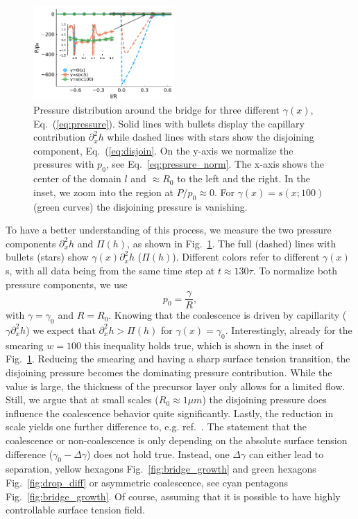 \documentclass[twocolumn,amsmath,amssymb,showpacs,pre,nofootinbib,superscriptaddress]{revtex4-1} %
\begin{document}
\begin{figure}
    \centering
    \includegraphics[width=0.48\textwidth]{Figures/pressures_three_gam_end.pdf}
    \caption{Pressure distribution around the bridge for three different $\gamma(x)$, Eq.~(\ref{eq:pressure}).
    Solid lines with bullets display the capillary contribution $\partial_x^2 h$ while dashed lines with stars show the disjoining component, Eq.~(\ref{eq:disjoin}.
    On the y-axis we normalize the pressures with $p_0$, see Eq.~\ref{eq:pressure_norm}.
    The x-axis shows the center of the domain $l$ and $\approx R_0$ to the left and the right.
    In the inset, we zoom into the region at $P/p_0 \approx 0$. 
    For $\gamma(x) = s(x;100)$ (green curves) the disjoining pressure is vanishing.}
    \label{fig:pressures}
\end{figure}
To have a better understanding of this process, we measure the two pressure components $\partial_x^2 h$ and $\Pi(h)$, as shown in Fig.~\ref{fig:pressures}.
The full (dashed) lines with bullets (stars) show $\gamma(x)\partial_x^2 h$ ($\Pi(h)$). 
Different colors refer to different $\gamma(x)$s, with all data being from the same time step at $t\approx 130\tau$.
To normalize both pressure components, we use 
\begin{equation}\label{eq:pressure_norm}
    p_0 = \frac{\gamma}{R},
\end{equation}
with $\gamma = \gamma_0$ and $R = R_0$.
Knowing that the coalescence is driven by capillarity ($\gamma\partial_x^2 h$) we expect that $\partial_x^2 h > \Pi(h)$ for $\gamma(x) = \gamma_0$.
Interestingly, already for the smearing $w=100$ this inequality holds true, which is shown in the inset of Fig.~\ref{fig:pressures}.
Reducing the smearing and having a sharp surface tension transition, the disjoining pressure becomes the dominating pressure contribution.
While the value is large, the thickness of the precursor layer only allows for a limited flow. 
Still, we argue that at small scales ($R_0 \approx 1\mu m$) the disjoining pressure does influence the coalescence behavior quite significantly.
Lastly, the reduction in scale yields one further difference to, e.g. ref.~\cite{karpitschka2014sharp}.
The statement that the coalescence or non-coalescence is only depending on the absolute surface tension difference ($\gamma_0-\Delta\gamma$) does not hold true.
Instead, one $\Delta\gamma$ can either lead to separation, yellow hexagons Fig.~\ref{fig:bridge_growth} and green hexagons Fig.~\ref{fig:drop_diff} or asymmetric coalescence, see cyan pentagons Fig.~\ref{fig:bridge_growth}.
Of course, assuming that it is possible to have highly controllable surface tension field.
\end{document}
